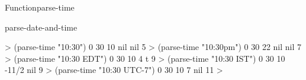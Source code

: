 \documentclass[10pt,twoside,english,pdftex]{article}
\begin{document}
\begin{functiondoc}{Function}{parse-time}{%
     
    }
\begin{alsos}{parse-date-and-time}
\end{alsos}

\fnexamples
%
\W\supp
\begin{example}
  > (parse-time "10:30")
  0
  30
  10
  nil
  nil
  5\goodpagebreak
  > (parse-time "10:30pm")
  0
  30
  22
  nil
  nil
  7\goodpagebreak
  > (parse-time "10:30 EDT")
  0
  30
  10
  4
  t
  9\goodpagebreak
  > (parse-time "10:30 IST")
  0
  30
  10
 -11/2
  nil
  9\goodpagebreak
  > (parse-time "10:30 UTC-7")
  0
  30
  10
  7
  nil
  11
  >
\end{example}

\end{functiondoc}

\end{document}
